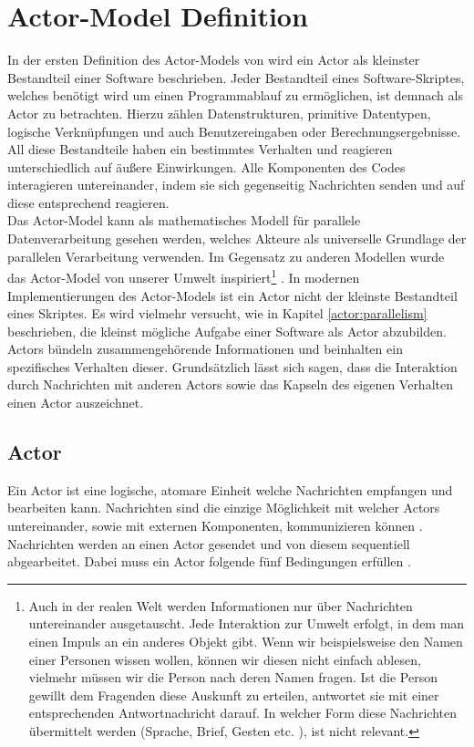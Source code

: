 \section{Actor-Model Definition}\label{actor:definition}
In der ersten Definition des Actor-Models von \cite{hewitt1973session} wird ein Actor als kleinster Bestandteil einer Software beschrieben. Jeder Bestandteil eines Software-Skriptes, welches benötigt wird um einen Programmablauf zu ermöglichen, ist demnach als Actor zu betrachten. Hierzu zählen Datenstrukturen, primitive Datentypen, logische Verknüpfungen und auch Benutzereingaben oder Berechnungsergebnisse. All diese Bestandteile haben ein bestimmtes Verhalten und reagieren unterschiedlich auf äußere Einwirkungen. Alle Komponenten des Codes interagieren untereinander, indem sie sich gegenseitig Nachrichten senden und auf diese entsprechend reagieren.\\
Das Actor-Model kann als mathematisches Modell für parallele Datenverarbeitung gesehen werden, welches Akteure als universelle Grundlage der parallelen Verarbeitung verwenden. Im Gegensatz zu anderen Modellen wurde das Actor-Model von unserer Umwelt inspiriert\footnote{Auch in der realen Welt werden Informationen nur über Nachrichten untereinander ausgetauscht. Jede Interaktion zur Umwelt erfolgt, in dem man einen Impuls an ein anderes Objekt gibt. Wenn wir beispielsweise den Namen einer Personen wissen wollen, können wir diesen nicht einfach ablesen, vielmehr müssen wir die Person nach deren Namen fragen. Ist die Person gewillt dem Fragenden diese Auskunft zu erteilen, antwortet sie mit einer entsprechenden Antwortnachricht darauf. In welcher Form diese Nachrichten übermittelt werden (Sprache, Brief, Gesten etc. ), ist nicht relevant.} \citep{Vernon2015ReactiveAkka}. In modernen Implementierungen des Actor-Models ist ein Actor nicht der kleinste Bestandteil eines Skriptes. Es wird vielmehr versucht, wie in Kapitel \ref{actor:parallelism} beschrieben, die kleinst mögliche Aufgabe einer Software als Actor abzubilden. \\
Actors bündeln zusammengehörende Informationen und beinhalten ein spezifisches Verhalten dieser. Grundsätzlich lässt sich sagen, dass die Interaktion durch Nachrichten mit anderen Actors sowie das Kapseln des eigenen Verhalten einen Actor auszeichnet.

\subsection{Actor}
Ein Actor ist eine logische, atomare Einheit welche Nachrichten empfangen und bearbeiten kann. Nachrichten sind die einzige Möglichkeit mit welcher Actors untereinander, sowie mit externen Komponenten, kommunizieren können \citep{Agha1985ConcurrentParallelism}. Nachrichten werden an einen Actor gesendet und von diesem sequentiell abgearbeitet. Dabei muss ein Actor folgende fünf Bedingungen erfüllen \citep{Agha1985ConcurrentParallelism}.

